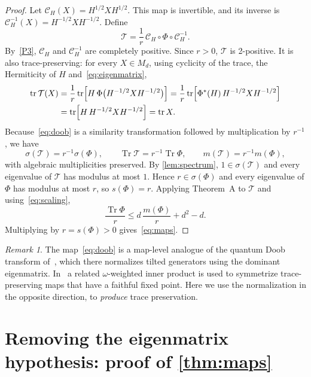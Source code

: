 \documentclass[11pt,a4paper]{article}
\theoremstyle{plain}
\theoremstyle{definition}
\theoremstyle{remark}
\newtheorem{remark}[theorem]{Remark}
\numberwithin{equation}{section}
\newcommand{\M}{M_d}
\newcommand{\tr}{\operatorname{tr}}
\newcommand{\Tr}{\operatorname{Tr}}
\newcommand{\spec}{\sigma}
\newcommand{\mmin}{m}
\newcommand{\smax}{s}
\newcommand{\cT}{\mathcal{T}}
\newcommand{\cC}{\mathcal{C}}
\begin{document}
\begin{proof}
Let $\cC_H(X)=H^{1/2}XH^{1/2}$. This map is invertible, and its inverse is
$\cC_H^{-1}(X)=H^{-1/2}XH^{-1/2}$. Define
\begin{equation}\label{eq:doob}
  \cT=\frac1r\,\cC_H\circ\Phi\circ\cC_H^{-1}.
\end{equation}
By~\ref{P3}, $\cC_H$ and $\cC_H^{-1}$ are completely positive. Since $r>0$, $\cT$ is
2-positive. It is also trace-preserving: for every $X\in\M$, using cyclicity of
the trace, the Hermiticity of $H$ and~\eqref{eq:eigenmatrix},
\begin{align*}
  \tr\cT(X)
  &=\frac1r\tr\Bigl[H\,\Phi\bigl(H^{-1/2}XH^{-1/2}\bigr)\Bigr]
   =\frac1r\tr\Bigl[\Phi^*(H)\,H^{-1/2}XH^{-1/2}\Bigr]\\
  &=\tr\Bigl[H\,H^{-1/2}XH^{-1/2}\Bigr]
   =\tr X .
\end{align*}
Because~\eqref{eq:doob} is a similarity transformation followed by multiplication
by $r^{-1}$, we have
\begin{equation}\label{eq:scaling}
  \spec(\cT)=r^{-1}\spec(\Phi),\qquad
  \Tr\cT=r^{-1}\Tr\Phi,\qquad
  \mmin(\cT)=r^{-1}\mmin(\Phi),
\end{equation}
with algebraic multiplicities preserved. By \cref{lem:spectrum}, $1\in\spec(\cT)$ and
every eigenvalue of $\cT$ has modulus at most $1$. Hence $r\in\spec(\Phi)$ and
every eigenvalue of $\Phi$ has modulus at most $r$, so $\smax(\Phi)=r$.
Applying Theorem~A to $\cT$ and using~\eqref{eq:scaling},
\[
  \frac{\Tr\Phi}{r}\le d\,\frac{\mmin(\Phi)}{r}+d^2-d .
\]
Multiplying by $r=\smax(\Phi)>0$ gives~\eqref{eq:maps}.
\end{proof}

\begin{remark}
The map~\eqref{eq:doob} is a map-level analogue of the quantum Doob transform
of~\cite{CGLP18}, which there normalizes tilted generators using the dominant
eigenmatrix. In~\cite{vEC+26} a related $\omega$-weighted inner product is used to
symmetrize trace-preserving maps that have a faithful fixed point. Here we use
the normalization in the opposite direction, to \emph{produce} trace
preservation.
\end{remark}

\section{Removing the eigenmatrix hypothesis: proof of \texorpdfstring{\cref{thm:maps}}{Theorem 2}}\label{sec:general}
\end{document}
